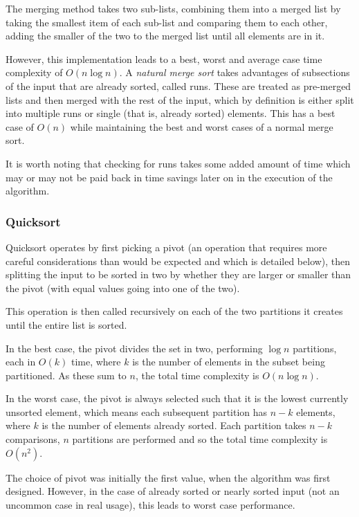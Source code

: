 \documentclass[]{article}
\begin{document}
The merging method takes two sub-lists, combining them into a merged list by taking the smallest item of each sub-list and comparing them to each other, adding the smaller of the two to the merged list until all elements are in it.

However, this implementation leads to a best, worst and average case time complexity of $O(n\log{n})$. A \emph{natural merge sort} takes advantages of subsections of the input that are already sorted, called runs. These are treated as pre-merged lists and then merged with the rest of the input, which by definition is either split into multiple runs or single (that is, already sorted) elements. This has a best case of $O(n)$ while maintaining the best and worst cases of a normal merge sort.

It is worth noting that checking for runs takes some added amount of time which may or may not be paid back in time savings later on in the execution of the algorithm.

\subsubsection{Quicksort}

Quicksort operates by first picking a pivot (an operation that requires more careful considerations than would be expected and which is detailed below), then splitting the input to be sorted in two by whether they are larger or smaller than the pivot (with equal values going into one of the two).

This operation is then called recursively on each of the two partitions it creates until the entire list is sorted.

In the best case, the pivot divides the set in two, performing $\log{n}$ partitions, each in $O(k)$ time, where $k$ is the number of elements in the subset being partitioned. As these sum to $n$, the total time complexity is $O(n\log{n})$.

In the worst case, the pivot is always selected such that it is the lowest currently unsorted element, which means each subsequent partition has $n-k$ elements, where $k$ is the number of elements already sorted. Each partition takes $n-k$ comparisons, $n$ partitions are performed and so the total time complexity is $O(n^2)$.

The choice of pivot was initially the first value, when the algorithm was first designed. However, in the case of already sorted or nearly sorted input (not an uncommon case in real usage), this leads to worst case performance.
\end{document}
